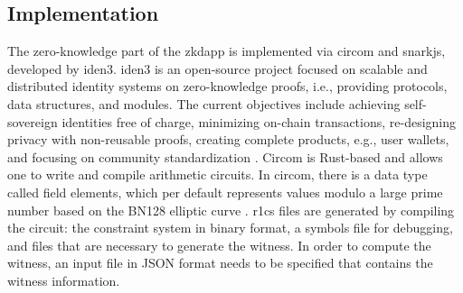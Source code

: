 \subsection{Implementation}
The zero-knowledge part of the \acrshort{zkdapp} is implemented via circom and snarkjs, developed by iden3. iden3 is an open-source project focused on scalable and distributed identity systems on zero-knowledge proofs, i.e., providing protocols, data structures, and modules. The current objectives include achieving self-sovereign identities free of charge, minimizing on-chain transactions, re-designing privacy with non-reusable proofs, creating complete products, e.g., user wallets, and focusing on community standardization \citep{iden3aboutus}. Circom is Rust-based and allows one to write and compile arithmetic circuits. In circom, there is a data type called field elements, which per default represents values modulo a large prime number based on the BN128 elliptic curve \citep{circom}. \acrshort{r1cs} files are generated by compiling the circuit: the constraint system in binary format, a symbols file for debugging, and files that are necessary to generate the witness. In order to compute the witness, an input file in JSON format needs to be specified that contains the witness information. 

